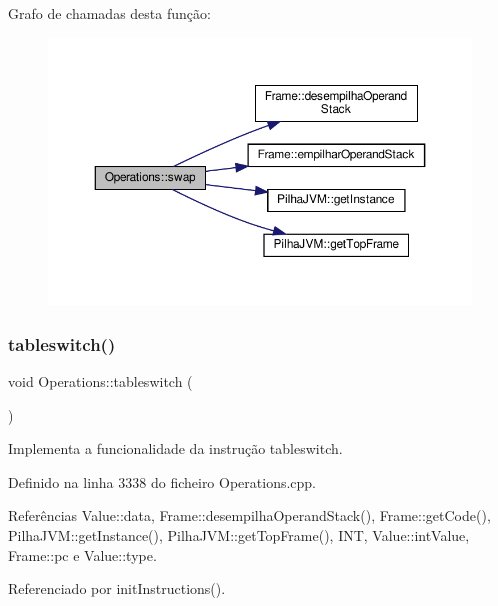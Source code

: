 Grafo de chamadas desta função\+:\nopagebreak
\begin{figure}[H]
\begin{center}
\leavevmode
\includegraphics[width=350pt]{classOperations_ad800d04ce11806455dd5b84a7ecd6144_cgraph}
\end{center}
\end{figure}
\mbox{\label{classOperations_a72955f43cde98b73c503e1a8c1505352}} 
\subsubsection{\texorpdfstring{tableswitch()}{tableswitch()}}
{\footnotesize\ttfamily void Operations\+::tableswitch (\begin{DoxyParamCaption}{ }\end{DoxyParamCaption})\hspace{0.3cm}{\ttfamily [private]}}



Implementa a funcionalidade da instrução tableswitch. 



Definido na linha 3338 do ficheiro Operations.\+cpp.



Referências Value\+::data, Frame\+::desempilha\+Operand\+Stack(), Frame\+::get\+Code(), Pilha\+J\+V\+M\+::get\+Instance(), Pilha\+J\+V\+M\+::get\+Top\+Frame(), I\+NT, Value\+::int\+Value, Frame\+::pc e Value\+::type.



Referenciado por init\+Instructions().

